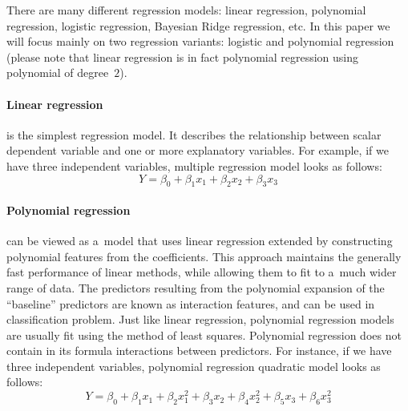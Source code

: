 \documentclass{llncs}
\begin{document}
There are many different regression models: linear regression, polynomial regression, logistic regression, Bayesian Ridge regression, etc. In this paper we will focus mainly on two regression variants: logistic and polynomial regression (please note that linear regression is in fact polynomial regression using polynomial of degree~$2$). 

\vspace{-3pt}
\paragraph{Linear regression} is the simplest regression model. It describes the relationship between scalar dependent variable and one or more explanatory variables. For example, if we have three independent variables, multiple regression model looks as follows: \vspace{-3pt}
\begin{equation} 
\label{eq:lineraregression} 
Y = \beta_{0} + \beta_{1}x_{1} + \beta_{2}x_{2} + \beta_{3}x_{3} 
\end{equation} 

\paragraph{Polynomial regression} can be viewed as a~model that uses linear regression extended by constructing polynomial features from the coefficients. This approach maintains the generally fast performance of linear methods, while allowing them to fit to a~much wider range of data. The predictors resulting from the polynomial expansion of the ``baseline'' predictors are known as interaction features, and can be used in classification problem. Just like linear regression, polynomial regression models are usually fit using the method of least squares. Polynomial regression does not contain in its formula interactions between predictors. For instance, if we have three independent variables, polynomial regression quadratic model looks as follows:\vspace{-3pt}
\begin{equation} 
\label{eq:polynomialregression} 
Y = \beta_{0} + \beta_{1}x_{1} + \beta_{2}x_{1}^{2} + \beta_{3}x_{2} + \beta_{4}x_{2}^{2}  + \beta_{5}x_{3} + \beta_{6}x_{3}^{2}
\end{equation} 
\end{document}
